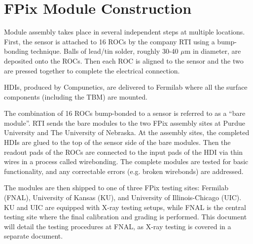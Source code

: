 \section{FPix Module Construction}
\label{s:construction}

Module assembly takes place in several independent steps at multiple locations.  
First, the sensor is attached to 16 ROCs by the company RTI using a bump-bonding technique.  
Balls of lead/tin solder, roughly 30-40 $\mu$m in diameter, are deposited onto the ROCs.  
Then each ROC is aligned to the sensor and the two are pressed together to complete the electrical connection.

HDIs, produced by Compunetics, are delivered to Fermilab where all the surface components (including the TBM) are mounted.

The combination of 16 ROCs bump-bonded to a sensor is referred to as a ``bare module''.  
RTI sends the bare modules to the two FPix assembly sites at Purdue University and The University of Nebraska.  
At the assembly sites, the completed HDIs are glued to the top of the sensor side of the bare modules.  
Then the readout pads of the ROCs are connected to the input pads of the HDI via thin wires in a process called wirebonding.  
The complete modules are tested for basic functionality, and any correctable errors (e.g. broken wirebonds) are addressed.

The modules are then shipped to one of three FPix testing sites:  
Fermilab (FNAL), University of Kansas (KU), and University of Illinois-Chicago (UIC).  
KU and UIC are equipped with X-ray testing setups, 
while FNAL is the central testing site where the final calibration and grading is performed.  
This document will detail the testing procedures at FNAL, as X-ray testing is covered in a separate document.
